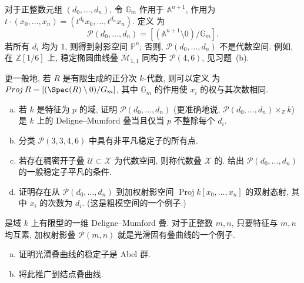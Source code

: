 \begin{example}[加权射影叠]\label{src:4.9.14}
对于正整数元组 $(d_0,\ldots,d_n)$, 令 $\mathbb G_m$ 作用于 $\mathbb A^{n+1}$, 作用为 $t\cdot(x_0,\ldots,x_n)=(t^{d_0}x_0,\ldots,t^{d_n}x_n)$. 定义 为
\[
\mathcal P(d_0,\ldots,d_n)=[(\mathbb A^{n+1}\setminus0)/\mathbb G_m].
\]
若所有 $d_i$ 均为 $1$, 则得到射影空间 $\mathbb P^n$; 否则, $\mathcal P(d_0,\ldots,d_n)$ 不是代数空间. 例如, 在 $\mathbb Z[1/6]$ 上, 稳定椭圆曲线叠 $\overline{\mathcal M}_{1,1}$ 同构于 $\mathcal P(4,6)$, 见习题~(b).

更一般地, 若 $R$ 是有限生成的正分次 $k$-代数, 则可以定义 为 $\mathcal{P}roj\,R=[(\Spec(R)\setminus0)/\mathbb G_m]$, 其中 $\mathbb G_m$ 的作用使 $x_i$ 的权与其次数相同.
\end{example}
\begin{exercise}\label{src:4.9.15}
\begin{enumerate}[(a)]
\item 若 $k$ 是特征为 $p$ 的域, 证明 $\mathcal P(d_0,\ldots,d_n)$ (更准确地说, $\mathcal P(d_0,\ldots,d_n)\times_{\mathbb Z}k$) 是 $k$ 上的 Deligne--Mumford 叠当且仅当 $p$ 不整除每个 $d_i$.
\item 分类 $\mathcal P(3,3,4,6)$ 中具有非平凡稳定子的所有点.
\item 若存在稠密开子叠 $\mathcal U\subset\mathcal X$ 为代数空间, 则称代数叠 $\mathcal X$ 的. 给出 $\mathcal P(d_0,\ldots,d_n)$ 的一般稳定子平凡的条件.
\item 证明存在从 $\mathcal P(d_0,\ldots,d_n)$ 到加权射影空间 $\operatorname{Proj}k[x_0,\ldots,x_n]$ 的双射态射, 其中 $x_i$ 的次数为 $d_i$. (这是粗模空间的一个例子.)
\end{enumerate}
\end{exercise}
\begin{example}[叠曲线]\label{src:4.9.16}
 是域 $k$ 上有限型的一维 Deligne--Mumford 叠. 对于正整数 $m,n$, 只要特征与 $m,n$ 均互素, 加权射影叠 $\mathcal P(m,n)$ 就是光滑固有叠曲线的一个例子.
\end{example}
\begin{exercise}\label{src:4.9.17}
\begin{enumerate}[(a)]
\item 证明光滑叠曲线的稳定子是 Abel 群.
\item 将此推广到结点叠曲线.
\end{enumerate}
\end{exercise}
